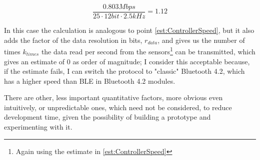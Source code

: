 \documentclass[a4paper, 10pt, final]{article} %
\begin{document}
\begin{enumerate}[label=\emph{(\arabic*)}]
\begin{figure}[H]
\begin{minipage}[b]{.35\linewidth}
\[                    \]
                \end{minipage}
                \begin{minipage}[b]{.35\linewidth}
                    \centering
                    \[
                        \frac{0.803Mbps}{25 \cdot 12bit \cdot 2.5kHz} = 1.12
                    \]
                \end{minipage}
            \end{figure}
            \noindent In this case the calculation is analogous to point \ref{est:ControllerSpeed}, but it also adds the factor of the data resolution in bits, $r_{data}$, and gives us the number of times $k_{times}$ the data read per second from the sensors\footnote{Again using the estimate in \ref{est:ControllerSpeed}} can be transmitted, which gives an estimate of $0$ as order of magnitude; I consider this acceptable because, if the estimate fails, I can switch the protocol to "classic" Bluetooth 4.2, which has a higher speed than BLE in Bluetooth 4.2 modules.
    \end{enumerate}
    \noindent There are other, less important quantitative factors, more obvious even intuitively, or unpredictable ones, which need not be considered, to reduce development time, given the possibility of building a prototype and experimenting with it.
\end{document}
